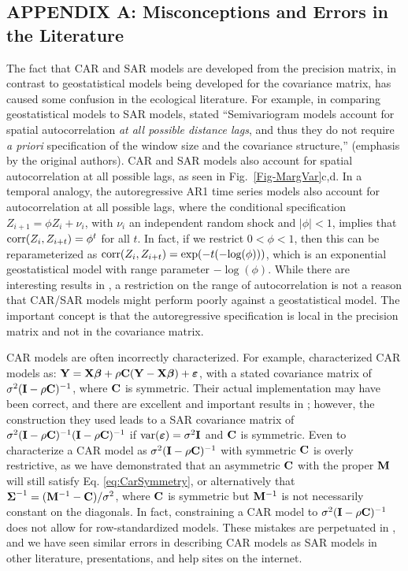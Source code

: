 \documentclass[11pt, titlepage]{article}\usepackage[]{graphicx}\usepackage[]{color}
\begin{document}
\begin{spacing}{1.9}
\begin{flushleft}
\clearpage
\setcounter{equation}{0}
\renewcommand{\theequation}{A.\arabic{equation}}
\setcounter{figure}{0}
\renewcommand{\thefigure}{A.\arabic{figure}}
\section{APPENDIX A: Misconceptions and Errors in the Literature}

The fact that CAR and SAR models are developed from the precision matrix, in contrast to geostatistical models being developed for the covariance matrix, has caused some confusion in the ecological literature.  For example, in comparing geostatistical models to SAR models, \citet{Begu:Puey:comp:2009} stated ``Semivariogram models account for spatial autocorrelation \emph{at all possible distance lags}, and thus they do not require \emph{a priori} specification of the window size and the covariance structure,'' (emphasis by the original authors).  CAR and SAR models also account for spatial autocorrelation at all possible lags, as seen in Fig.~\ref{Fig-MargVar}c,d.  In a temporal analogy, the autoregressive AR1 time series models also account for autocorrelation at all possible lags, where the conditional specification $Z_{i+1} = \phi Z_i + \nu_i$, with $\nu_i$ an independent random shock and $|\phi| < 1$, implies that $\textrm{corr}(Z_{i},Z_{i+t}) = \phi^t$ for all $t$.  In fact, if we restrict $0 < \phi < 1$, then this can be reparameterized as $\textrm{corr}(Z_{i},Z_{i+t}) = \exp(-t(-\textrm{log}(\phi)))$, which is an exponential geostatistical model with range parameter $-\log(\phi)$.  While there are interesting results in \citet{Begu:Puey:comp:2009}, a restriction on the range of autocorrelation is not a reason that CAR/SAR models might perform poorly against a geostatistical model.  The important concept is that the autoregressive specification is local in the precision matrix and not in the covariance matrix.

CAR models are often incorrectly characterized.  For example, \citet{Keit:Bjor:Dixo:Citr:acco:2002} characterized CAR models as: $\mathbf{Y} = \mathbf{X}\mbox{\boldmath $\beta$} + \rho\mathbf{C}(\mathbf{Y} - \mathbf{X}\mbox{\boldmath $\beta$}) + \mbox{\boldmath $\varepsilon$}$, with a stated covariance matrix of $\sigma^2(\mathbf{I} - \rho\mathbf{C})^{-1}$, where $\mathbf{C}$ is symmetric. Their actual implementation may have been correct, and there are excellent and important results in \citet{Keit:Bjor:Dixo:Citr:acco:2002}; however, the construction they used leads to a SAR covariance matrix of $\sigma^2(\mathbf{I} - \rho\mathbf{C})^{-1}(\mathbf{I} - \rho\mathbf{C})^{-1}$ if $\textrm{var}(\mbox{\boldmath $\varepsilon$}) = \sigma^2\mathbf{I}$ and $\mathbf{C}$ is symmetric. Even to characterize a CAR model as $\sigma^2(\mathbf{I} - \rho\mathbf{C})^{-1}$ with symmetric $\mathbf{C}$ is overly restrictive, as we have demonstrated that an asymmetric $\mathbf{C}$ with the proper $\mathbf{M}$ will still satisfy Eq. \ref{eq:CarSymmetry}, or alternatively that $\mbox{\boldmath $\Sigma$}^{-1} = (\mathbf{M}^{-1} - \mathbf{C})/\sigma^2$, where $\mathbf{C}$ is symmetric but $\mathbf{M}^{-1}$ is not necessarily constant on the diagonals. In fact, constraining a CAR model to $\sigma^2(\mathbf{I} - \rho\mathbf{C})^{-1}$ does not allow for row-standardized models.  These mistakes are perpetuated in \citet{Dorm:etal:meth:2007}, and we have seen similar errors in describing CAR models as SAR models in other literature, presentations, and help sites on the internet. 


\end{flushleft}
\end{spacing}
\end{document}
